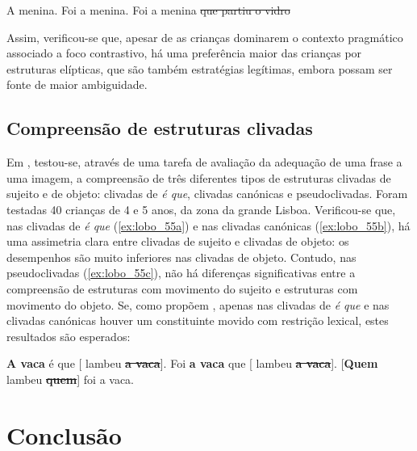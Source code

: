 \documentclass[output=paper]{LSP/langsci}
\begin{document}
\ea\label{ex:lobo_54}
\ea\label{ex:lobo_54a} A menina.
\ex\label{ex:lobo_54b} Foi a menina.
\ex\label{ex:lobo_54c} Foi a menina \sout{que partiu o vidro}
\zl

Assim, verificou-se que, apesar de as crianças dominarem o contexto pragmático associado a foco contrastivo, há uma preferência maior das crianças por estruturas elípticas, que são também estratégias legítimas, embora possam ser fonte de maior ambiguidade. 


\subsection{Compreensão de estruturas clivadas}
\label{subsec:lobo_compreensao_clivadas}

Em \citet{lobo_etal2014}, testou-se, através de uma tarefa de avaliação da adequação de uma frase a uma imagem, a compreensão de três diferentes tipos de estruturas clivadas de sujeito e de objeto: clivadas de \textit{é que}, clivadas canónicas e pseudoclivadas. Foram testadas 40 crianças de 4 e 5 anos, da zona da grande Lisboa. Verificou-se que, nas clivadas de \textit{é que} (\ref{ex:lobo_55a}) e nas clivadas canónicas (\ref{ex:lobo_55b}), há uma assimetria clara entre clivadas de sujeito e clivadas de objeto: os desempenhos são muito inferiores nas clivadas de objeto. Contudo, nas pseudoclivadas (\ref{ex:lobo_55c}), não há diferenças significativas entre a compreensão de estruturas com movimento do sujeito e estruturas com movimento do objeto. Se, como propõem \citet{lobo_etal2014}, apenas nas clivadas de \textit{é que} e nas clivadas canónicas houver um constituinte movido com restrição lexical, estes resultados são esperados:

\ea\label{ex:lobo_55}
\ea\label{ex:lobo_55a} \textbf{A vaca} é que [ lambeu \sout{\textbf{a vaca}}].
\ex\label{ex:lobo_55b} Foi \textbf{a vaca} que [ lambeu \sout{\textbf{a vaca}}].
\ex\label{ex:lobo_55c} [\textbf{Quem}  lambeu \sout{\textbf{quem}}] foi a vaca.
\zl


\section{Conclusão}
\label{sec:lobo_conc}
\end{document}
